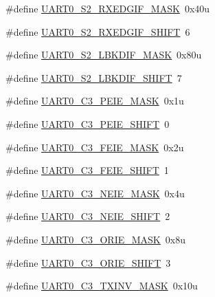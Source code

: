 \begin{DoxyCompactItemize}
\#define \hyperlink{group___u_a_r_t0___register___masks_gaa8912e7668721bb52173cf2d57d9a2df}{U\+A\+R\+T0\+\_\+\+S2\+\_\+\+R\+X\+E\+D\+G\+I\+F\+\_\+\+M\+A\+SK}~0x40u
\item 
\#define \hyperlink{group___u_a_r_t0___register___masks_ga0e308d65c84418d41a1e1e7e08d2f49a}{U\+A\+R\+T0\+\_\+\+S2\+\_\+\+R\+X\+E\+D\+G\+I\+F\+\_\+\+S\+H\+I\+FT}~6
\item 
\#define \hyperlink{group___u_a_r_t0___register___masks_gac15518365f64c684798c3480deaf83f0}{U\+A\+R\+T0\+\_\+\+S2\+\_\+\+L\+B\+K\+D\+I\+F\+\_\+\+M\+A\+SK}~0x80u
\item 
\#define \hyperlink{group___u_a_r_t0___register___masks_gabeff0aee55751aab92571d26a934a04a}{U\+A\+R\+T0\+\_\+\+S2\+\_\+\+L\+B\+K\+D\+I\+F\+\_\+\+S\+H\+I\+FT}~7
\item 
\#define \hyperlink{group___u_a_r_t0___register___masks_ga756c38b1457b21e8bc4c364f890b7390}{U\+A\+R\+T0\+\_\+\+C3\+\_\+\+P\+E\+I\+E\+\_\+\+M\+A\+SK}~0x1u
\item 
\#define \hyperlink{group___u_a_r_t0___register___masks_gafce96820de4fce25539d9bc3f0bee376}{U\+A\+R\+T0\+\_\+\+C3\+\_\+\+P\+E\+I\+E\+\_\+\+S\+H\+I\+FT}~0
\item 
\#define \hyperlink{group___u_a_r_t0___register___masks_gaa01da5d1e8dc6f89dc58c0104beba4b2}{U\+A\+R\+T0\+\_\+\+C3\+\_\+\+F\+E\+I\+E\+\_\+\+M\+A\+SK}~0x2u
\item 
\#define \hyperlink{group___u_a_r_t0___register___masks_gaafe99b12e9534395e8c36a86dd3d2e98}{U\+A\+R\+T0\+\_\+\+C3\+\_\+\+F\+E\+I\+E\+\_\+\+S\+H\+I\+FT}~1
\item 
\#define \hyperlink{group___u_a_r_t0___register___masks_ga44fe8fd48c0fac9eda6b76bba6174f45}{U\+A\+R\+T0\+\_\+\+C3\+\_\+\+N\+E\+I\+E\+\_\+\+M\+A\+SK}~0x4u
\item 
\#define \hyperlink{group___u_a_r_t0___register___masks_ga60c064efad2eef2bc2ebebe2c0ffd1b9}{U\+A\+R\+T0\+\_\+\+C3\+\_\+\+N\+E\+I\+E\+\_\+\+S\+H\+I\+FT}~2
\item 
\#define \hyperlink{group___u_a_r_t0___register___masks_ga728e7b520b1f4122c701a1fec02dce60}{U\+A\+R\+T0\+\_\+\+C3\+\_\+\+O\+R\+I\+E\+\_\+\+M\+A\+SK}~0x8u
\item 
\#define \hyperlink{group___u_a_r_t0___register___masks_ga01878e41bfd1652bb4c6e4a27a11dd68}{U\+A\+R\+T0\+\_\+\+C3\+\_\+\+O\+R\+I\+E\+\_\+\+S\+H\+I\+FT}~3
\item 
\#define \hyperlink{group___u_a_r_t0___register___masks_gaead58bbfecceef15fc563180b19dea48}{U\+A\+R\+T0\+\_\+\+C3\+\_\+\+T\+X\+I\+N\+V\+\_\+\+M\+A\+SK}~0x10u

\end{DoxyCompactItemize}
